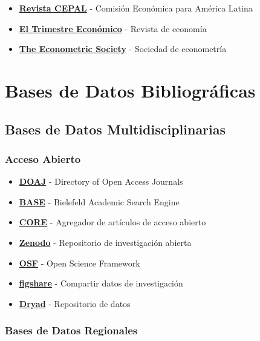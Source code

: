 \documentclass[
  jou,
  floatsintext,
  longtable,
  a4paper,
  nolmodern,
  notxfonts,
  notimes,
  12pt,
  colorlinks=true,linkcolor=blue,citecolor=blue,urlcolor=blue]{apa7}
\providecommand{\tightlist}{%
  \setlength{\itemsep}{0pt}\setlength{\parskip}{0pt}}
\begin{document}
\begin{itemize}
\tightlist
\item
  \textbf{\href{https://www.cepal.org/es/publicaciones/tipo/revista-cepal}{Revista
  CEPAL}} - Comisión Económica para América Latina
\item
  \textbf{\href{https://www.eltrimestreeconomico.com.mx/index.php/te}{El
  Trimestre Económico}} - Revista de economía
\item
  \textbf{\href{https://www.econometricsociety.org/}{The Econometric
  Society}} - Sociedad de econometría
\end{itemize}

\section{Bases de Datos
Bibliográficas}\label{bases-de-datos-bibliogruxe1ficas}

\subsection{Bases de Datos
Multidisciplinarias}\label{bases-de-datos-multidisciplinarias}

\subsubsection{Acceso Abierto}\label{acceso-abierto}

\begin{itemize}
\tightlist
\item
  \textbf{\href{https://doaj.org/}{DOAJ}} - Directory of Open Access
  Journals
\item
  \textbf{\href{https://www.base-search.net/}{BASE}} - Bielefeld
  Academic Search Engine
\item
  \textbf{\href{https://core.ac.uk/}{CORE}} - Agregador de artículos de
  acceso abierto
\item
  \textbf{\href{https://zenodo.org/}{Zenodo}} - Repositorio de
  investigación abierta
\item
  \textbf{\href{https://osf.io/}{OSF}} - Open Science Framework
\item
  \textbf{\href{https://figshare.com/}{figshare}} - Compartir datos de
  investigación
\item
  \textbf{\href{https://datadryad.org/stash}{Dryad}} - Repositorio de
  datos
\end{itemize}

\subsubsection{Bases de Datos
Regionales}\label{bases-de-datos-regionales}
\end{document}
